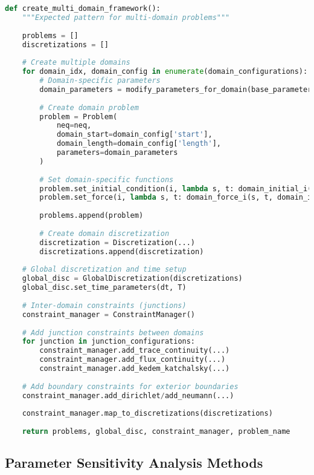 \begin{lstlisting}[language=Python, caption=Expected Multi-Domain Problem Pattern]
def create_multi_domain_framework():
    """Expected pattern for multi-domain problems"""
    
    problems = []
    discretizations = []
    
    # Create multiple domains
    for domain_idx, domain_config in enumerate(domain_configurations):
        # Domain-specific parameters
        domain_parameters = modify_parameters_for_domain(base_parameters, domain_config)
        
        # Create domain problem
        problem = Problem(
            neq=neq,
            domain_start=domain_config['start'],
            domain_length=domain_config['length'],
            parameters=domain_parameters
        )
        
        # Set domain-specific functions
        problem.set_initial_condition(i, lambda s, t: domain_initial_i(s, t, domain_idx))
        problem.set_force(i, lambda s, t: domain_force_i(s, t, domain_idx))
        
        problems.append(problem)
        
        # Create domain discretization
        discretization = Discretization(...)
        discretizations.append(discretization)
    
    # Global discretization and time setup
    global_disc = GlobalDiscretization(discretizations)
    global_disc.set_time_parameters(dt, T)
    
    # Inter-domain constraints (junctions)
    constraint_manager = ConstraintManager()
    
    # Add junction constraints between domains
    for junction in junction_configurations:
        constraint_manager.add_trace_continuity(...)
        constraint_manager.add_flux_continuity(...)
        constraint_manager.add_kedem_katchalsky(...)
    
    # Add boundary constraints for exterior boundaries
    constraint_manager.add_dirichlet/add_neumann(...)
    
    constraint_manager.map_to_discretizations(discretizations)
    
    return problems, global_disc, constraint_manager, problem_name
\end{lstlisting}

\subsection{Parameter Sensitivity Analysis Methods}
\label{subsec:parameter_sensitivity_methods}

